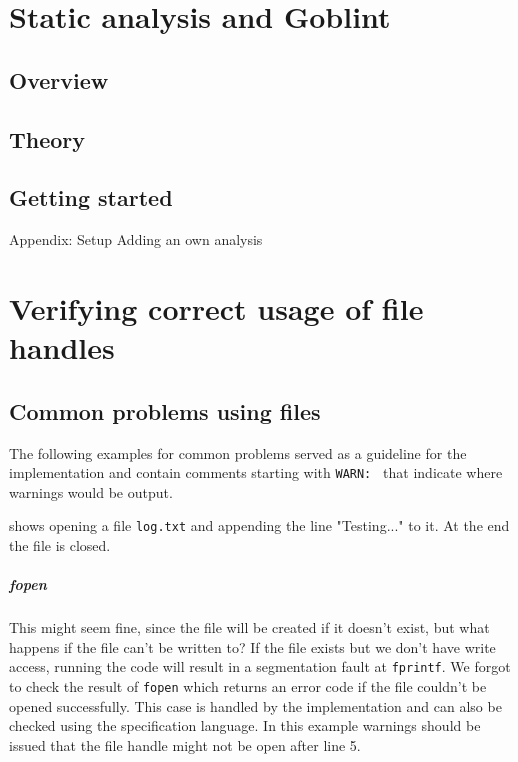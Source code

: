 


\chapter{Static analysis and Goblint}
\section{Overview}

\section{Theory}

\section{Getting started}
Appendix: Setup
Adding an own analysis


\chapter{Verifying correct usage of file handles}
\section{Common problems using files}
The following examples for common problems served as a guideline for the implementation and contain comments starting with \verb|WARN: | that indicate where warnings would be output.

 shows opening a file \verb|log.txt| and appending the line "Testing..." to it. At the end the file is closed.

\paragraph*{fopen}
This might seem fine, since the file will be created if it doesn't exist, but what happens if the file can't be written to?
If the file exists but we don't have write access, running the code will result in a segmentation fault at \verb|fprintf|.
We forgot to check the result of \verb|fopen| which returns an error code if the file couldn't be opened successfully.
This case is handled by the implementation and can also be checked using the specification language. In this example warnings should be issued that the file handle might not be open after line 5.

